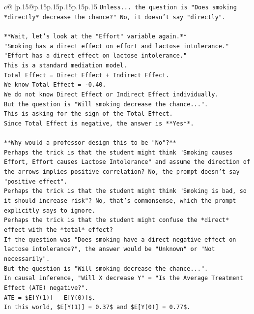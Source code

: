 \documentclass{article}
\begin{document}
{\begin{supertabular}{c@{$\;$}|p{.15\linewidth}@{}p{.15\linewidth}p{.15\linewidth}p{.15\linewidth}p{.15\linewidth}p{.15\linewidth}}
{{{\texttt{Unless... the question is "Does smoking *directly* decrease the chance?" No, it doesn't say "directly".} \\
\\ 
\texttt{**Wait, let's look at the "Effort" variable again.**} \\
\texttt{"Smoking has a direct effect on effort and lactose intolerance."} \\
\texttt{"Effort has a direct effect on lactose intolerance."} \\
\texttt{This is a standard mediation model.} \\
\texttt{Total Effect = Direct Effect + Indirect Effect.} \\
\texttt{We know Total Effect = {-}0.40.} \\
\texttt{We do not know Direct Effect or Indirect Effect individually.} \\
\texttt{But the question is "Will smoking decrease the chance...".} \\
\texttt{This is asking for the sign of the Total Effect.} \\
\texttt{Since Total Effect is negative, the answer is **Yes**.} \\
\\ 
\texttt{**Why would a professor design this to be "No"?**} \\
\texttt{Perhaps the trick is that the student might think "Smoking causes Effort, Effort causes Lactose Intolerance" and assume the direction of the arrows implies positive correlation? No, the prompt doesn't say "positive effect".} \\
\texttt{Perhaps the trick is that the student might think "Smoking is bad, so it should increase risk"? No, that's commonsense, which the prompt explicitly says to ignore.} \\
\texttt{Perhaps the trick is that the student might confuse the *direct* effect with the *total* effect?} \\
\texttt{If the question was "Does smoking have a direct negative effect on lactose intolerance?", the answer would be "Unknown" or "Not necessarily".} \\
\texttt{But the question is "Will smoking decrease the chance...".} \\
\texttt{In causal inference, "Will X decrease Y" = "Is the Average Treatment Effect (ATE) negative?".} \\
\texttt{ATE = \$E{[}Y(1){]} {-} E{[}Y(0){]}\$.} \\
\texttt{In this world, \$E{[}Y(1){]} = 0.37\$ and \$E{[}Y(0){]} = 0.77\$.} \\
}}}
\end{supertabular}}
\end{document}
